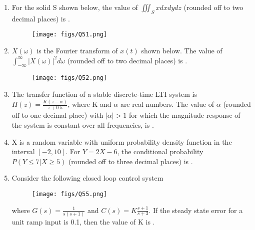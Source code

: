 \documentclass[a4paper, 11pt]{article}
\begin{document}
\begin{enumerate}
    \hfill{}

    \item For the solid S shown below, the value of $\iiint_S x dxdydz$ (rounded off to two decimal places) is \underline{\hspace{2cm}}.
    \begin{figure}[H]
        \centering
        \texttt{[image: figs/Q51.png]}
        \caption*{}
        \label{fig:q61}
    \end{figure}
    
    \hfill{}

    \item $X(\omega)$ is the Fourier transform of $x(t)$ shown below. The value of $\int_{-\infty}^{\infty} |X(\omega)|^2 d\omega$ (rounded off to two decimal places) is \underline{\hspace{2cm}}.
    \begin{figure}[H]
        \centering
        \texttt{[image: figs/Q52.png]}
        \caption*{}
        \label{fig:q62}
    \end{figure}

    \hfill{}

    \item The transfer function of a stable discrete-time LTI system is $H(z) = \frac{K(z-\alpha)}{z+0.5}$, where K and $\alpha$ are real numbers. The value of $\alpha$ (rounded off to one decimal place) with $|\alpha|>1$ for which the magnitude response of the system is constant over all frequencies, is \underline{\hspace{2cm}}.

    \hfill{}

    \item X is a random variable with uniform probability density function in the interval $[-2, 10]$. For $Y=2X-6$, the conditional probability $P(Y \le 7 | X \ge 5)$ (rounded off to three decimal places) is \underline{\hspace{2cm}}.

    \hfill{}

    \item Consider the following closed loop control system
    \begin{figure}[H]
        \centering
        \texttt{[image: figs/Q55.png]}
        \caption*{}
        \label{fig:q65}
    \end{figure}
    where $G(s) = \frac{1}{s(s+1)}$ and $C(s) = K\frac{s+1}{s+3}$. If the steady state error for a unit ramp input is 0.1, then the value of K is \underline{\hspace{2cm}}.
    
    \hfill{}

\end{enumerate}
\end{document}
